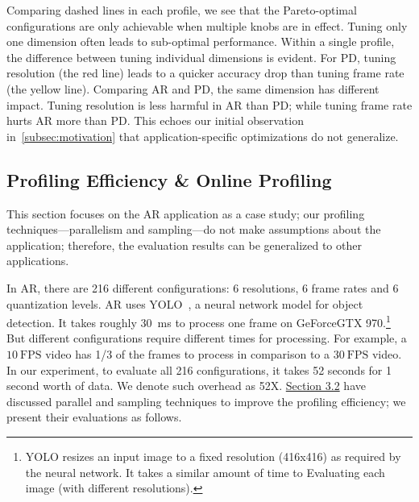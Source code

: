  Comparing dashed lines in each
profile, we see that the Pareto-optimal configurations are only achievable when
multiple knobs are in effect. Tuning only one dimension often leads to
sub-optimal performance. Within a single profile, the difference between tuning
individual dimensions is evident. For PD, tuning resolution (the red line) leads
to a quicker accuracy drop than tuning frame rate (the yellow line). Comparing
AR and PD, the same dimension has different impact. Tuning resolution is less
harmful in AR than PD; while tuning frame rate hurts AR more than PD\@. This
echoes our initial observation in~\autoref{subsec:motivation} that
application-specific optimizations do not generalize.


\subsection{Profiling Efficiency \& Online Profiling}
\label{sec:online-profiling}

This section focuses on the AR application as a case study; our profiling
techniques---parallelism and sampling---do not make assumptions about the
application; therefore, the evaluation results can be generalized to other
applications.

In AR, there are 216 different configurations: 6 resolutions, 6 frame rates and
6 quantization levels. AR uses YOLO~\cite{redmon2016yolo9000}, a neural network
model for object detection. It takes roughly \SI{30}{\ms} to process one frame
on GeForce\textregistered\space GTX 970.\footnote{YOLO resizes an input image to
  a fixed resolution (416x416) as required by the neural network. It takes a
  similar amount of time to Evaluating each image (with different resolutions).}
But different configurations require different times for processing. For
example, a \(10~\text{FPS}\) video has 1/3 of the frames to process in
comparison to a \(30~\text{FPS}\) video.  In our experiment, to evaluate all 216
configurations, it takes 52 seconds for 1 second worth of data. We denote such
overhead as 52X\@. \hyperref[sec:automatic-profiling]{Section 3.2} have
discussed parallel and sampling techniques to improve the profiling efficiency;
we present their evaluations as follows.

